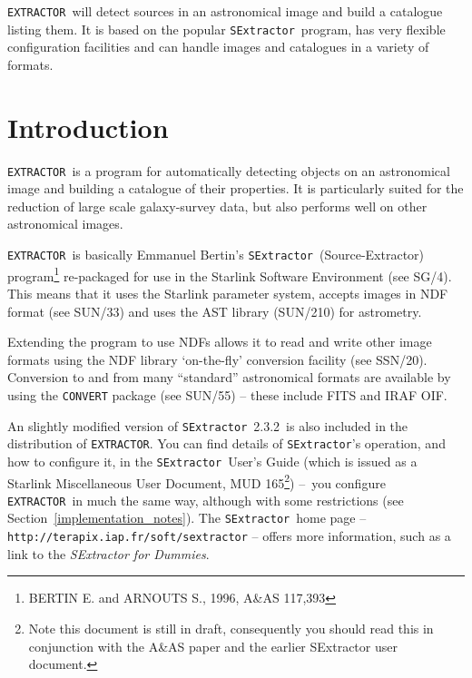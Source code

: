 \documentclass[twoside,11pt]{article}
\newcommand{\stardocinitials}  {SUN}
\newcommand{\stardocnumber}    {226.8}
\newcommand{\stardocabstract}  {\EXTRACTOR\ will detect sources in
an astronomical image and build a catalogue listing them. It is based on the
popular \SExtractor\ program, has very flexible configuration
facilities and can handle images and catalogues in a variety of formats.}
\newcommand{\sexversion}{2.3.2}
\newcommand{\stardocname}{\stardocinitials /\stardocnumber}
\newcommand{\htmladdnormallink}[2]{#1}
\newcommand{\htmlref}[2]{#1}
\newenvironment{latexonly}{}{}
\newcommand{\latex}[1]{#1}
\newcommand{\xref}[3]{#1}
\newcommand{\xlabel}[1]{}
\renewcommand{\_}{\texttt{\symbol{95}}}
\newcommand{\EXTRACTOR}{\texttt{EXTRACTOR}}
\newcommand{\CONVERT}{\texttt{CONVERT}}
\newcommand{\SExtractor}{\texttt{SExtractor}}
\newcommand{\SExtractorURL}{http://terapix.iap.fr/soft/sextractor}
\newcommand{\DUMMIESURL}{http://www-int.stsci.edu/~holwerda/se.html}
\newcommand{\IRAFURL}{http://www.starlink.rl.ac.uk/iraf/web/iraf-homepage.html}
\newcommand{\FITSURL}{http://fits.gsfc.nasa.gov/}
\newcommand{\dash}{--}
\newcommand{\dash}{-}
\renewcommand{\thepage}{\roman{page}}
\begin{document}
\stardocabstract
  \newpage
  \begin{latexonly}
    \setlength{\parskip}{0mm}
    \tableofcontents
    \setlength{\parskip}{\medskipamount}
    \markboth{\stardocname}{\stardocname}
  \end{latexonly}
\cleardoublepage
\renewcommand{\thepage}{\arabic{page}}
\setcounter{page}{1}

\section{\xlabel{introduction}Introduction}
\EXTRACTOR\ is a program for automatically detecting objects on an
astronomical image and building a catalogue of their properties. It is
particularly suited for the reduction of large scale galaxy-survey
data, but also performs well on other astronomical images.

\EXTRACTOR\ is basically Emmanuel Bertin's \SExtractor\
(Source-Extractor) program\footnote{BERTIN E. and ARNOUTS S., 1996,
A\&AS 117,393} re-packaged for use in the
\xref{Starlink Software Environment}{sg4}{} \latex{(see SG/4)}.
This means that it uses the Starlink parameter system, accepts images in
\xref{NDF}{sun33}{abstract} format \latex{(see SUN/33)} and uses the
\xref{AST}{sun210}{} library \latex{(SUN/210)} for astrometry.

Extending the program to use NDFs allows it to read and write other
image formats using the NDF library \xref{`on-the-fly' conversion
facility}{ssn20}{abstract} \latex{(see SSN/20)}.  Conversion to and
from many ``standard'' astronomical
\xref{formats}{sun55}{the_default_conversion_commands} are available
by using the \xref{\CONVERT}{sun55}{abstract} package \latex{(see
SUN/55)} -- these include \htmladdnormallink{FITS}{\FITSURL} and
\htmladdnormallink{IRAF}{\IRAFURL} OIF.

An slightly modified version of \SExtractor\ \sexversion\ is also
included in the distribution of \EXTRACTOR.
You can find details of \SExtractor's operation, and how to configure
it, in the \htmladdnormallink{\SExtractor\ User's Guide}{\MUD} (which is
issued as a Starlink Miscellaneous User Document, MUD 165\footnote{Note this
document is still in draft, consequently you should read this in
conjunction with the \htmladdnormallink{A\&AS paper}{sexpaper.ps}
and the \htmladdnormallink{earlier SExtractor user document}{sex1_doc.ps}.})
\dash\ you configure \EXTRACTOR\
in much the same way, although with
\htmlref{some restrictions}{implementation_notes}
\latex{(see Section~\ref{implementation_notes})}. The \SExtractor\ home page
-- \htmladdnormallink{\texttt{\SExtractorURL}}{\SExtractorURL} -- 
offers more information, such as a link to the 
\htmladdnormallink{\textit{SExtractor for Dummies}}{\DUMMIESURL}.
\end{document}
